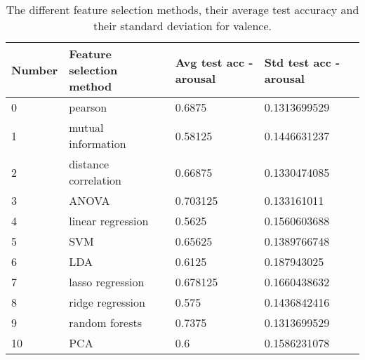 
\begin{table}[H]
\centering
\begin{tabular}{llll}
\textbf{Number} & \textbf{Feature selection method} & \textbf{Avg test acc - arousal} & \textbf{Std test acc - arousal} \\ \hline
0               & pearson                           & 0.6875                              & 0.1313699529                    \\
1               & mutual information                & 0.58125                             & 0.1446631237                    \\
2               & distance correlation              & 0.66875                             & 0.1330474085                    \\
3               & ANOVA                             & 0.703125                            & 0.133161011                     \\
4               & linear regression                 & 0.5625                              & 0.1560603688                    \\
5               & SVM                               & 0.65625                             & 0.1389766748                    \\
6               & LDA                               & 0.6125                              & 0.187943025                     \\
7               & lasso regression                  & 0.678125                            & 0.1660438632                    \\
8               & ridge regression                  & 0.575                               & 0.1436842416                    \\
9               & random forests                    & 0.7375                              & 0.1313699529                    \\
10              & PCA                               & 0.6                                 & 0.1586231078                   
\end{tabular}
\caption{The different feature selection methods, their average test accuracy and their standard deviation for valence\label{accCompLblvalence}.}
\end{table}

